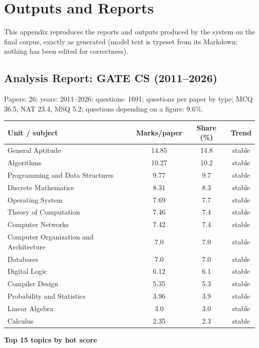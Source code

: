 \chapter{Outputs and Reports}\label{app:outputs}

This appendix reproduces the reports and outputs produced by the system on the final corpus, exactly as generated (model text is typeset from its Markdown; nothing has been edited for correctness).

\section{Analysis Report: GATE CS (2011--2026)}
Papers: 26; years: 2011--2026; questions: 1691; questions per paper by type: MCQ 36.5, NAT 23.4, MSQ 5.2; questions depending on a figure: 9.6\%.
\begin{center}\small\begin{tabular}{@{}lccc@{}}\toprule \textbf{Unit / subject} & \textbf{Marks/paper} & \textbf{Share (\%)} & \textbf{Trend}\\\midrule
General Aptitude & 14.85 & 14.8 & stable\\
Algorithms & 10.27 & 10.2 & stable\\
Programming and Data Structures & 9.77 & 9.7 & stable\\
Discrete Mathematics & 8.31 & 8.3 & stable\\
Operating System & 7.69 & 7.7 & stable\\
Theory of Computation & 7.46 & 7.4 & stable\\
Computer Networks & 7.42 & 7.4 & stable\\
Computer Organization and Architecture & 7.0 & 7.0 & stable\\
Databases & 7.0 & 7.0 & stable\\
Digital Logic & 6.12 & 6.1 & stable\\
Compiler Design & 5.35 & 5.3 & stable\\
Probability and Statistics & 3.96 & 3.9 & stable\\
Linear Algebra & 3.0 & 3.0 & stable\\
Calculus & 2.35 & 2.3 & stable\\
\bottomrule\end{tabular}\end{center}
\noindent\textbf{Top 15 topics by hot score}\par\smallskip
